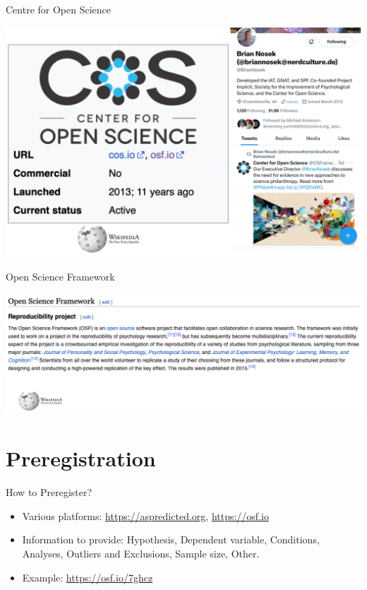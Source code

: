 \documentclass[
  ignorenonframetext,
  aspectratio=169,
]{beamer}
\providecommand{\tightlist}{%
  \setlength{\itemsep}{0pt}\setlength{\parskip}{0pt}}\usepackage{longtable,booktabs,array}
\begin{document}
\begin{frame}{Centre for Open Science}
\label{centre-for-open-science}
\begin{center}
\includegraphics{figs/cos.png}
\end{center}
\end{frame}

\begin{frame}{Open Science Framework}
\label{open-science-framework}
\begin{center}
\includegraphics{figs/osf.png}
\end{center}
\end{frame}

\section{Preregistration}\label{preregistration-1}

\begin{frame}{How to Preregister?}
\label{how-to-preregister}
\begin{itemize}
\tightlist
\item
  Various platforms: \url{https://aspredicted.org}, \url{https://osf.io}
\item
  Information to provide: Hypothesis, Dependent variable, Conditions,
  Analyses, Outliers and Exclusions, Sample size, Other.
\item
  Example: \url{https://osf.io/7ghcz}
\end{itemize}
\end{frame}
\end{document}
